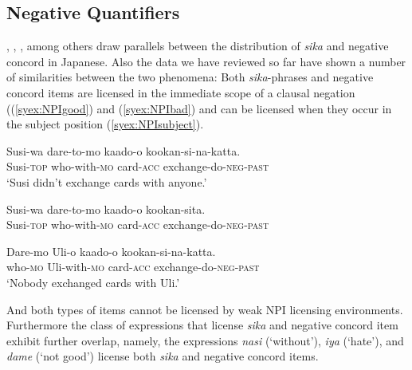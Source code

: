 \documentclass[output=paper,colorlinks,citecolor=brown,
]{langscibook}
\let\l\lambda
\def\M#1{\textsc{#1}}
\begin{document}
    


    





\subsection{Negative Quantifiers}\label{sysc:negq}

\cite{aoyagi94}, \cite{kawahara08a}, \cite{tanaka97a}, \cite{yoshimura2007b} among others draw parallels between the distribution of \emph{sika} and negative concord in Japanese.
Also the data we have reviewed so far have shown a number of similarities between the two phenomena: Both \emph{sika}-phrases and negative concord items are licensed in the immediate scope of a clausal negation ((\ref{syex:NPIgood}) and (\ref{syex:NPIbad}) and can be licensed when they occur in the subject position (\ref{syex:NPIsubject}).


\ea \label{syex:NPIgood}
\gll Susi-wa dare-to-mo kaado-o kookan-si-na-katta.\\
Susi-\M{top} who-with-\M{mo} card-\M{acc} exchange-do-\M{neg}-\M{past}\\
\glt `Susi didn't exchange cards with anyone.'\z

\ea \label{syex:NPIbad}
\gll *Susi-wa dare-to-mo kaado-o kookan-sita.\\
Susi-\M{top} who-with-\M{mo} card-\M{acc} exchange-do-\M{neg}-\M{past}\\\z

\ea \label{syex:NPIsubject}
\gll Dare-mo Uli-o kaado-o kookan-si-na-katta.\\
who-\M{mo} Uli-with-\M{mo} card-\M{acc} exchange-do-\M{neg}-\M{past}\\
\glt `Nobody exchanged cards with Uli.'\z




And both types of items cannot be licensed by weak NPI licensing environments.  Furthermore the class of expressions that license \emph{sika} and negative concord item exhibit further overlap, namely, the expressions \emph{nasi} (`without'), \emph{iya} (`hate'), and \emph{dame} (`not good') license both \emph{sika} and negative concord items.
\end{document}
